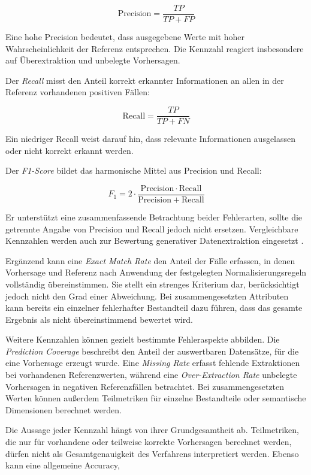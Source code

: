 \[
\mathrm{Precision} = \frac{TP}{TP + FP}
\]

Eine hohe Precision bedeutet, dass ausgegebene Werte mit hoher Wahrscheinlichkeit der Referenz entsprechen. Die Kennzahl reagiert insbesondere auf Überextraktion und unbelegte 
Vorhersagen.

Der \emph{Recall} misst den Anteil korrekt erkannter Informationen an allen in der Referenz vorhandenen positiven Fällen:

\[
\mathrm{Recall} = \frac{TP}{TP + FN}
\]

Ein niedriger Recall weist darauf hin, dass relevante Informationen ausgelassen oder nicht korrekt erkannt werden.

Der \emph{F1-Score} bildet das harmonische Mittel aus Precision und Recall:

\[
F_1 = 2 \cdot
\frac{\mathrm{Precision} \cdot \mathrm{Recall}}
{\mathrm{Precision} + \mathrm{Recall}}
\]

Er unterstützt eine zusammenfassende Betrachtung beider Fehlerarten, sollte die getrennte Angabe von Precision und Recall jedoch nicht ersetzen. Vergleichbare Kennzahlen 
werden auch zur Bewertung generativer Datenextraktion eingesetzt \cite{data_extraction_ai}.

Ergänzend kann eine \emph{Exact Match Rate} den Anteil der Fälle erfassen, in denen Vorhersage und Referenz nach Anwendung der festgelegten Normalisierungsregeln vollständig 
übereinstimmen. Sie stellt ein strenges Kriterium dar, berücksichtigt jedoch nicht den Grad einer Abweichung. Bei zusammengesetzten Attributen kann bereits ein einzelner 
fehlerhafter Bestandteil dazu führen, dass das gesamte Ergebnis als nicht übereinstimmend bewertet wird.

Weitere Kennzahlen können gezielt bestimmte Fehleraspekte abbilden. Die \emph{Prediction Coverage} beschreibt den Anteil der auswertbaren Datensätze, für die eine Vorhersage 
erzeugt wurde. Eine \emph{Missing Rate} erfasst fehlende Extraktionen bei vorhandenen Referenzwerten, während eine \emph{Over-Extraction Rate} unbelegte Vorhersagen in 
negativen Referenzfällen betrachtet. Bei zusammengesetzten Werten können außerdem Teilmetriken für einzelne Bestandteile oder semantische Dimensionen berechnet werden.

Die Aussage jeder Kennzahl hängt von ihrer Grundgesamtheit ab. Teilmetriken, die nur für vorhandene oder teilweise korrekte Vorhersagen berechnet werden, dürfen nicht als 
Gesamtgenauigkeit des Verfahrens interpretiert werden. Ebenso kann eine allgemeine Accuracy,

